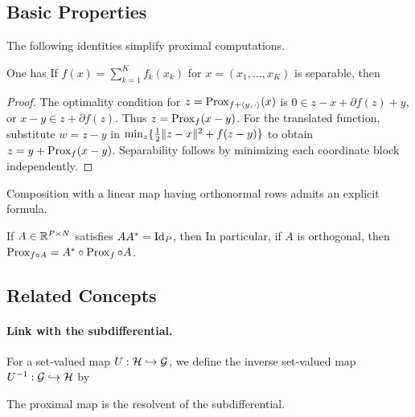 \subsection{Basic Properties}

The following identities simplify proximal computations.

\begin{prop}
One has
If $f(x)=\sum_{k=1}^K f_k(x_k)$ for $x=(x_1,\ldots,x_K)$ is separable, then
\end{prop}
\begin{proof}
The optimality condition for $z=\operatorname{Prox}_{f+\langle y,\,\cdot\rangle}(x)$ is $0\in z-x+\partial f(z)+y$, or $x-y\in z+\partial f(z)$. Thus $z=\operatorname{Prox}_f(x-y)$. For the translated function, substitute $w=z-y$ in
$\min_z\{\frac12\lVert z-x\rVert^2+f(z-y)\}$ to obtain $z=y+\operatorname{Prox}_f(x-y)$. Separability follows by minimizing each coordinate block independently.
\end{proof}

Composition with a linear map having orthonormal rows admits an explicit formula.

\begin{prop}\label{prop-prox-tightframe}
	If $A \in \mathbb{R}^{P \times N}$ satisfies $AA^*=\mathrm{Id}_P$, then
	In particular, if $A$ is orthogonal, then $\operatorname{Prox}_{f \circ A} = A^* \circ \operatorname{Prox}_{f} \circ A$.
\end{prop}


\subsection{Related Concepts}

\paragraph{Link with the subdifferential.}

For a set-valued map $U : \mathcal{H} \hookrightarrow \mathcal{G}$, we define the inverse set-valued map $U^{-1} : \mathcal{G} \hookrightarrow \mathcal{H}$ by 

The proximal map is the resolvent of the subdifferential.


